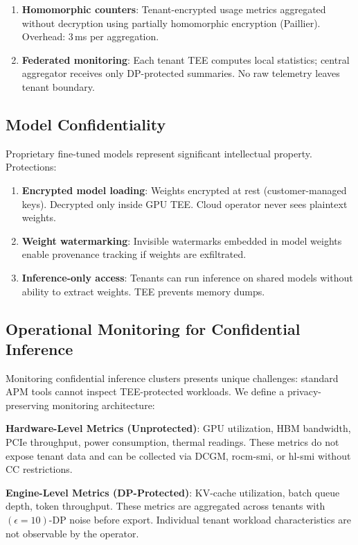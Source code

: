 \documentclass[conference,10pt]{IEEEtran}
\begin{document}
\begin{enumerate}
\item \textbf{Homomorphic counters}: Tenant-encrypted usage metrics aggregated without decryption using partially homomorphic encryption (Paillier). Overhead: 3\,ms per aggregation.
\item \textbf{Federated monitoring}: Each tenant TEE computes local statistics; central aggregator receives only DP-protected summaries. No raw telemetry leaves tenant boundary.
\end{enumerate}

\subsection{Model Confidentiality}

Proprietary fine-tuned models represent significant intellectual property. Protections:

\begin{enumerate}
\item \textbf{Encrypted model loading}: Weights encrypted at rest (customer-managed keys). Decrypted only inside GPU TEE. Cloud operator never sees plaintext weights.
\item \textbf{Weight watermarking}: Invisible watermarks embedded in model weights enable provenance tracking if weights are exfiltrated.
\item \textbf{Inference-only access}: Tenants can run inference on shared models without ability to extract weights. TEE prevents memory dumps.
\end{enumerate}

\subsection{Operational Monitoring for Confidential Inference}

Monitoring confidential inference clusters presents unique challenges: standard APM tools cannot inspect TEE-protected workloads. We define a privacy-preserving monitoring architecture:

\textbf{Hardware-Level Metrics (Unprotected)}: GPU utilization, HBM bandwidth, PCIe throughput, power consumption, thermal readings. These metrics do not expose tenant data and can be collected via DCGM, rocm-smi, or hl-smi without CC restrictions.

\textbf{Engine-Level Metrics (DP-Protected)}: KV-cache utilization, batch queue depth, token throughput. These metrics are aggregated across tenants with $(\epsilon=10)$-DP noise before export. Individual tenant workload characteristics are not observable by the operator.
\end{document}
